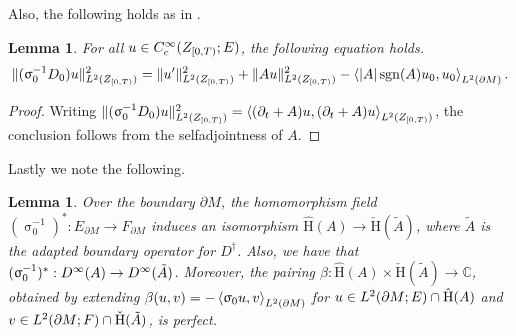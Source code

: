 \documentclass[a4paper,10pt,reqno]{amsart}
\newcommand{\sym}{\upsigma}
\newcommand{\C}{\mathbb{C}}
\newcommand{\modulus}[1]{|#1|}
\newcommand{\norm}[1]{\| #1 \|}%
\newcommand{\Lp}[2][{}]{{\rm L}^{#2}_{\rm #1}}%
\newcommand{\Ck}[2][{}]{{\rm C}^{#2}_{\rm #1}}%
\newcommand{\Dk}[2][{}]{{\rm D}^{#2}_{\rm #1}}%
\newcommand{\checkH}{\check{\mathrm{H}}}
\newcommand{\hatH}{\hat{\mathrm{H}}}
\DeclareMathOperator{\sgn}{sgn}%
\newcommand{\inprod}[1]{\left\langle #1 \right\rangle}%
\newcommand{\dM}{\partial M}
\newtheorem{lemma}[theorem]{Lemma}
\theoremstyle{definition}
\begin{document}
Also, the following holds as in \cite{BB12}.
\begin{lemma}
\label{Lem:Ell}
For all $u \in \Ck[c]{\infty}(Z_{[0,T)};E)$, the following equation holds.
$$\norm{(\sym_0^{-1} D_0)u}^2_{\Lp{2}(Z_{[0,T)})}
= \norm{u'}^2_{\Lp{2}(Z_{[0,T)})} + \norm{Au}^2 _{\Lp{2}(Z_{[0,T)})}- \inprod{\modulus{A}\sgn(A) u_0, u_0}_{\Lp{2}(\dM)}.$$
\end{lemma}
\begin{proof}
Writing $\norm{(\sym^{-1}_0 D_0)u}_{\Lp{2}(Z_{[0,T)})}^2 = \inprod{ (\partial_t + A) u, (\partial_t + A)u}_{\Lp{2}(Z_{[0,T)})}$, the conclusion follows from the selfadjoint\-ness of $A$.
\end{proof}

Lastly we note the following.
\begin{lemma}
\label{Lem:BdyHom}
Over the boundary $\dM$, the homomorphism field $(\sym_0^{-1})^\ast: E_{\dM} \to F_{\dM}$ induces an isomorphism $\hatH(A) \to \checkH(\tilde{A})$, where $\tilde{A}$ is the adapted boundary operator for $D^\dagger$.
Also, we have that $(\sym_0^{-1})^\ast: \Dk{\infty}(A) \to \Dk{\infty}(\tilde{A})$.
Moreover, the pairing  $\beta: \hatH(A) \times \checkH(\tilde{A}) \to \C$, obtained by extending  $\beta(u,v) = -\inprod{\sym_0 u,v}_{\Lp{2}(\dM)}$ for $u \in \Lp{2}(\dM;E) \cap \hatH(A)$ and $v \in \Lp{2}(\dM;F) \cap \checkH(\tilde{A})$, is perfect.
\end{lemma}
\end{document}
